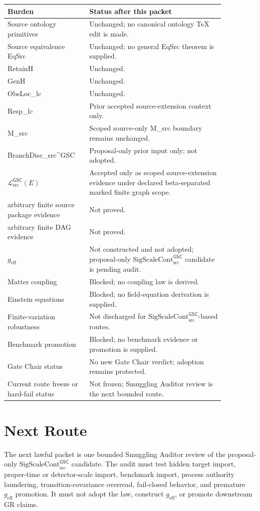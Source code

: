 \documentclass[11pt]{article}
\newcommand{\MetricData}{\mathcal{L}_{\mathrm{src}}^{\mathsf{GSC}}}
\newcommand{\geff}{g_{\mathrm{eff}}}
\newcommand{\SigScaleCont}{\mathrm{SigScaleCont}_{\mathrm{src}}^{\mathsf{GSC}}}
\begin{document}
\begin{longtable}{p{0.30\linewidth}p{0.56\linewidth}}
\toprule
Burden & Status after this packet \\
\midrule
Source ontology primitives & Unchanged; no canonical ontology TeX edit is made. \\
Source equivalence EqSrc & Unchanged; no general EqSrc theorem is supplied. \\
RetainH & Unchanged. \\
GenH & Unchanged. \\
ObsLoc\_lc & Unchanged. \\
Resp\_lc & Prior accepted source-extension context only. \\
M\_src & Scoped source-only M\_src boundary remains unchanged. \\
BranchDisc\_src\textasciicircum GSC & Proposal-only prior input only; not adopted. \\
\(\MetricData(E)\) & Accepted only as scoped source-extension evidence under
declared beta-separated marked finite graph scope. \\
arbitrary finite source package evidence & Not proved. \\
arbitrary finite DAG evidence & Not proved. \\
\(\geff\) & Not constructed and not adopted; proposal-only
\(\SigScaleCont\) candidate is pending audit. \\
Matter coupling & Blocked; no coupling law is derived. \\
Einstein equations & Blocked; no field-equation derivation is supplied. \\
Finite-variation robustness & Not discharged for \(\SigScaleCont\)-based routes. \\
Benchmark promotion & Blocked; no benchmark evidence or promotion is supplied. \\
Gate Chair status & No new Gate Chair verdict; adoption remains protected. \\
Current route freeze or hard-fail status & Not frozen; Smuggling Auditor review
is the next bounded route. \\
\bottomrule
\end{longtable}

\section{Next Route}

The next lawful packet is one bounded Smuggling Auditor review of the
proposal-only \(\SigScaleCont\) candidate. The audit must test hidden target
import, proper-time or detector-scale import, benchmark import, process
authority laundering, transition-covariance overread, fail-closed behavior,
and premature \(\geff\) promotion. It must not adopt the law, construct
\(\geff\), or promote downstream GR claims.
\end{document}
